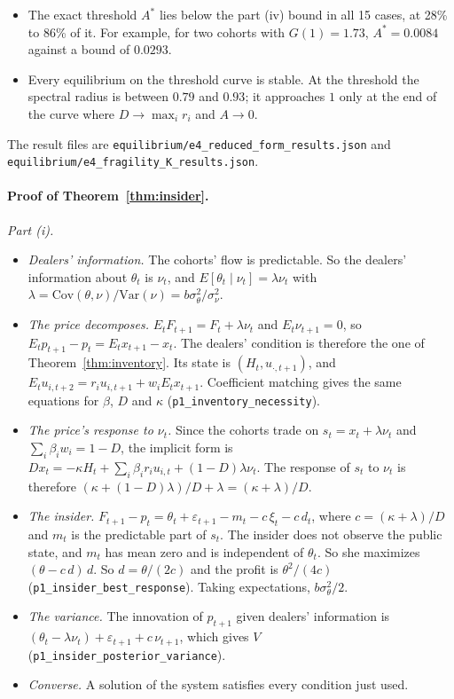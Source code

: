 \documentclass[12pt]{article}
\theoremstyle{definition}
\theoremstyle{remark}
\begin{document}
\begin{itemize}[itemsep=1pt,topsep=2pt]
\item The exact threshold $A^*$ lies below the part (iv) bound in all 15 cases, at 28\% to 86\% of it. For example, for two cohorts with $G(1)=1.73$, $A^*=0.0084$ against a bound of $0.0293$.
\item Every equilibrium on the threshold curve is stable. At the threshold the spectral radius is between $0.79$ and $0.93$; it approaches $1$ only at the end of the curve where $D\to\max_ir_i$ and $A\to0$.
\end{itemize}
The result files are \nolinkurl{equilibrium/e4_reduced_form_results.json} and \nolinkurl{equilibrium/e4_fragility_K_results.json}.

\paragraph{Proof of Theorem~\ref{thm:insider}.}
\emph{Part (i).}
\begin{itemize}[itemsep=1pt,topsep=2pt]
\item \emph{Dealers' information.} The cohorts' flow is predictable. So the dealers' information about $\theta_t$ is $\nu_t$, and $E[\theta_t\mid\nu_t]=\lambda\nu_t$ with $\lambda=\mathrm{Cov}(\theta,\nu)/\mathrm{Var}(\nu)=b\sigma_\theta^2/\sigma_\nu^2$.
\item \emph{The price decomposes.} $E_tF_{t+1}=F_t+\lambda\nu_t$ and $E_t\nu_{t+1}=0$, so $E_tp_{t+1}-p_t=E_tx_{t+1}-x_t$. The dealers' condition is therefore the one of Theorem~\ref{thm:inventory}. Its state is $(H_t,u_{\cdot,t+1})$, and $E_tu_{i,t+2}=r_iu_{i,t+1}+w_iE_tx_{t+1}$. Coefficient matching gives the same equations for $\beta$, $D$ and $\kappa$ (\nolinkurl{p1_inventory_necessity}).
\item \emph{The price's response to $\nu_t$.} Since the cohorts trade on $s_t=x_t+\lambda\nu_t$ and $\sum_i\beta_iw_i=1-D$, the implicit form is $Dx_t=-\kappa H_t+\sum_i\beta_ir_iu_{i,t}+(1-D)\lambda\nu_t$. The response of $s_t$ to $\nu_t$ is therefore $(\kappa+(1-D)\lambda)/D+\lambda=(\kappa+\lambda)/D$.
\item \emph{The insider.} $F_{t+1}-p_t=\theta_t+\varepsilon_{t+1}-m_t-c\,\xi_t-c\,d_t$, where $c=(\kappa+\lambda)/D$ and $m_t$ is the predictable part of $s_t$. The insider does not observe the public state, and $m_t$ has mean zero and is independent of $\theta_t$. So she maximizes $(\theta-c\,d)\,d$. So $d=\theta/(2c)$ and the profit is $\theta^2/(4c)$ (\nolinkurl{p1_insider_best_response}). Taking expectations, $b\sigma_\theta^2/2$.
\item \emph{The variance.} The innovation of $p_{t+1}$ given dealers' information is $(\theta_t-\lambda\nu_t)+\varepsilon_{t+1}+c\,\nu_{t+1}$, which gives $V$ (\nolinkurl{p1_insider_posterior_variance}).
\item \emph{Converse.} A solution of the system satisfies every condition just used.
\end{itemize}
\end{document}
